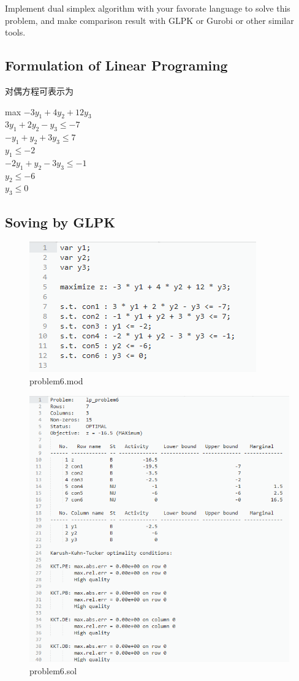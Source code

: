 \documentclass{article}
\begin{document}
Implement dual simplex algorithm with your favorate language to solve this problem, and make comparison result with GLPK or Gurobi or other similar tools.


\subsection{Formulation of Linear Programing}
对偶方程可表示为
\begin{center}
max $-3y_1 + 4y_2 + 12y_3$\\
$3y_1 + 2y_2 - y_3 \leq -7$\\
$-y_1 + y_2 + 3y_3 \leq 7$\\
$y_1 \leq -2$\\
$-2y_1 + y_2 -3y_3 \leq -1$\\
$y_2 \leq -6$\\
$y_3 \leq 0$
\end{center}

\subsection{Soving by GLPK}
\begin{figure}[h]
	\centering
	\includegraphics[width=0.5\linewidth]{problem6mod.png}
	\caption{problem6.mod} 
\end{figure}

\begin{figure}[h]
	\centering
	\includegraphics[width=0.8\linewidth]{problem6sol.png}
	\caption{problem6.sol} 
\end{figure}


\end{document}
